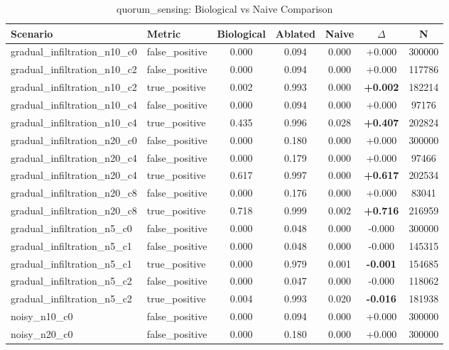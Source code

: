 \begin{table}[h]
\caption{quorum\_sensing: Biological vs Naive Comparison}
\centering
\begin{tabular}{llccccc}
\toprule
Scenario & Metric & Biological & Ablated & Naive & $\Delta$ & N \\
\midrule
gradual\_infiltration\_n10\_c0 & false\_positive & 0.000 & 0.094 & 0.000 & +0.000 & 300000 \\
gradual\_infiltration\_n10\_c2 & false\_positive & 0.000 & 0.094 & 0.000 & +0.000 & 117786 \\
gradual\_infiltration\_n10\_c2 & true\_positive & 0.002 & 0.993 & 0.000 & \textbf{+0.002} & 182214 \\
gradual\_infiltration\_n10\_c4 & false\_positive & 0.000 & 0.094 & 0.000 & +0.000 & 97176 \\
gradual\_infiltration\_n10\_c4 & true\_positive & 0.435 & 0.996 & 0.028 & \textbf{+0.407} & 202824 \\
gradual\_infiltration\_n20\_c0 & false\_positive & 0.000 & 0.180 & 0.000 & +0.000 & 300000 \\
gradual\_infiltration\_n20\_c4 & false\_positive & 0.000 & 0.179 & 0.000 & +0.000 & 97466 \\
gradual\_infiltration\_n20\_c4 & true\_positive & 0.617 & 0.997 & 0.000 & \textbf{+0.617} & 202534 \\
gradual\_infiltration\_n20\_c8 & false\_positive & 0.000 & 0.176 & 0.000 & +0.000 & 83041 \\
gradual\_infiltration\_n20\_c8 & true\_positive & 0.718 & 0.999 & 0.002 & \textbf{+0.716} & 216959 \\
gradual\_infiltration\_n5\_c0 & false\_positive & 0.000 & 0.048 & 0.000 & -0.000 & 300000 \\
gradual\_infiltration\_n5\_c1 & false\_positive & 0.000 & 0.048 & 0.000 & -0.000 & 145315 \\
gradual\_infiltration\_n5\_c1 & true\_positive & 0.000 & 0.979 & 0.001 & \textbf{-0.001} & 154685 \\
gradual\_infiltration\_n5\_c2 & false\_positive & 0.000 & 0.047 & 0.000 & -0.000 & 118062 \\
gradual\_infiltration\_n5\_c2 & true\_positive & 0.004 & 0.993 & 0.020 & \textbf{-0.016} & 181938 \\
noisy\_n10\_c0 & false\_positive & 0.000 & 0.094 & 0.000 & +0.000 & 300000 \\
noisy\_n20\_c0 & false\_positive & 0.000 & 0.180 & 0.000 & +0.000 & 300000 \\

\end{tabular}
\end{table}
